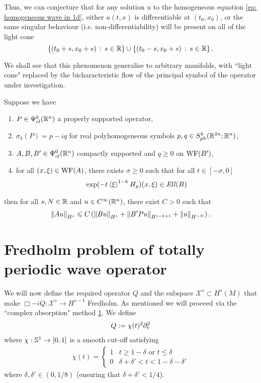 \documentclass[12pt]{article}
\begin{document}
Thus, we can conjecture that for any solution $u$ to the homogeneous equation \ref{eq: homogeneous wave in 1d}, either $u(t, x)$ is differentiable at $(t_0, x_0)$, or the same singular behaviour (i.e. non-differentiability) will be present on all of the light cone 
$$\set{(t_0 + s, x_0 +s) \wh s \in \R} \cup \set{(t_0 - s, x_0 + s) \wh s \in \R}.$$

 We shall see that this phenomenon generalise to arbitrary manifolds, with ``light cone" replaced by the bicharacteristic flow of the principal symbol of the operator under investigation. 


\begin{ftheorem} 
    Suppose we have 
    \begin{enumerate}
        \item $P \in \Psi^k_{cl}(\R^n)$ a properly supported operator,
        \item $\sigma_{k}(P) = p - iq$ for real polyhomogeneous symbols $p, q \in S^{k}_{ph}(\R^{2n}; \R^{n})$, 
        \item $A, B, B' \in \Psi^{0}_{cl}(\R^n)$ compactly supported and $q \geq 0 $ on $\WF(B')$, 
        \item for all $(x, \xi) \in \WF(A)$, there exists $\sigma \geq 0$ such that for all $t \in [-\sigma, 0]$
        \begin{align*}
            \exp(-t\sym[\xi]^{1-k}H_p)(x, \xi) \in \Ell(B)
        \end{align*}
    \end{enumerate}
    then for all $s, N \in \R$ and $u \in C^\infty(\R^n)$, there exist $C > 0$ such that 
    \begin{align*}
        \norm[Au]_{H^s} \leq C\brac{\norm[Bu]_{H^s} + \norm[B'Pu]_{H^{s - k + 1}} + \norm[u]_{H^{-N}}}. 
    \end{align*}
\end{ftheorem}



\section{Fredholm problem of totally periodic wave operator} 
We will now define the required operator $Q$ and the subspace $\mathcal{X}^s \subset H^{s}(M)$ that make $\Box - iQ: \mathcal{X}^s \to H^{s -1}$ Fredholm.  As mentioned we will proceed via the ``complex absorption" method \ref{}. We define
\begin{align*}
Q := \chi(t)^2 \p_t^2
\end{align*}
where $\chi : \S^1 \to [0, 1]$ is a smooth cut-off satisfying
\begin{align*}
\chi(t) = 
\begin{cases}
1 & t \geq  1 - \delta \text{ or } t \leq \delta \\
0 &  \delta + \delta' < t < 1 - \delta - \delta'
\end{cases}
\end{align*}
where $\delta, \delta' \in (0, 1/8)$ (ensuring that $\delta+ \delta' < 1/4$). 
\end{document}

